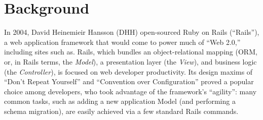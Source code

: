 
\section{Background}
\label{sec:motivation}

In 2004, David Heinemieir Hansson (DHH) open-sourced Ruby on Rails (``Rails''), a web application framework that would come to power much of ``Web 2.0,'' including sites such as. Rails, which bundles an object-relational mapping (ORM, or, in Rails terms, the \textit{Model}), a presentation layer (the \textit{View}), and business logic (the \textit{Controller}), is focused on web developer productivity. Its design maxims of ``Don't Repeat Yourself'' and ``Convention over Configuration'' proved a popular choice among developers, who took advantage of the framework's  ``agility'': many common tasks, such as adding a new application Model (and performing a schema migration), are easily achieved via a few standard Rails commands.
